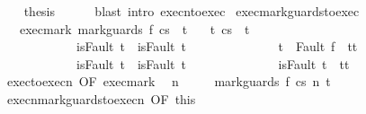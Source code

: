 \begin{isabellebody}
\ \ \isamarkupfalse%
\ {\isacharquery}thesis\isanewline
\ \ \ \ \isamarkupfalse%
\ {\isacharparenleft}blast\ intro{\isacharcolon}\ execn{\isacharunderscore}to{\isacharunderscore}exec{\isacharparenright}\isanewline
{}\isamarkupfalse%
%
\endisatagproof
{\isafoldproof}%
%
\isadelimproof
\isanewline
%
\endisadelimproof
\isanewline
\isanewline
{}\isamarkupfalse%
\ exec{\isacharunderscore}mark{\isacharunderscore}guards{\isacharunderscore}to{\isacharunderscore}exec{\isacharcolon}\isanewline
\ \ \ exec{\isacharunderscore}mark{\isacharcolon}\ {\isachardoublequoteopen}{\isasymGamma}{\isasymturnstile}{\isasymlangle}mark{\isacharunderscore}guards\ f\ c{\isacharcomma}s{\isasymrangle}\ {\isasymRightarrow}\ t{\isachardoublequoteclose}\isanewline
\ \ \ {\isachardoublequoteopen}{\isasymexists}t{\isacharprime}{\isachardot}\ {\isasymGamma}{\isasymturnstile}{\isasymlangle}c{\isacharcomma}s{\isasymrangle}\ {\isasymRightarrow}\ t{\isacharprime}\ {\isasymand}\ \isanewline
\ \ \ \ \ \ \ \ \ \ \ \ {\isacharparenleft}isFault\ t\ {\isasymlongrightarrow}\ isFault\ t{\isacharprime}{\isacharparenright}\ {\isasymand}\ \isanewline
\ \ \ \ \ \ \ \ \ \ \ \ {\isacharparenleft}t{\isacharprime}\ {\isacharequal}\ Fault\ f\ {\isasymlongrightarrow}\ t{\isacharprime}{\isacharequal}t{\isacharparenright}\ {\isasymand}\isanewline
\ \ \ \ \ \ \ \ \ \ \ \ {\isacharparenleft}isFault\ t{\isacharprime}\ {\isasymlongrightarrow}\ isFault\ t{\isacharparenright}\ {\isasymand}\isanewline
\ \ \ \ \ \ \ \ \ \ \ \ {\isacharparenleft}{\isasymnot}\ isFault\ t{\isacharprime}\ {\isasymlongrightarrow}\ t{\isacharprime}{\isacharequal}t{\isacharparenright}{\isachardoublequoteclose}\isanewline
%
\isadelimproof
%
\endisadelimproof
%
\isatagproof
{}\isamarkupfalse%
\ {\isacharminus}\isanewline
\ \ \isamarkupfalse%
\ exec{\isacharunderscore}to{\isacharunderscore}execn\ {\isacharbrackleft}OF\ exec{\isacharunderscore}mark{\isacharbrackright}\ \isamarkupfalse%
\ n\ \isanewline
\ \ \ \ {\isachardoublequoteopen}{\isasymGamma}{\isasymturnstile}{\isasymlangle}mark{\isacharunderscore}guards\ f\ c{\isacharcomma}s{\isasymrangle}\ {\isacharequal}n{\isasymRightarrow}\ t{\isachardoublequoteclose}\ \isacommand{{\isachardot}{\isachardot}}\isamarkupfalse%
\isanewline
\ \ \isamarkupfalse%
\ execn{\isacharunderscore}mark{\isacharunderscore}guards{\isacharunderscore}to{\isacharunderscore}execn\ {\isacharbrackleft}OF\ this{\isacharbrackright}\isanewline
\ \ \isamarkupfalse%

\end{isabellebody}
